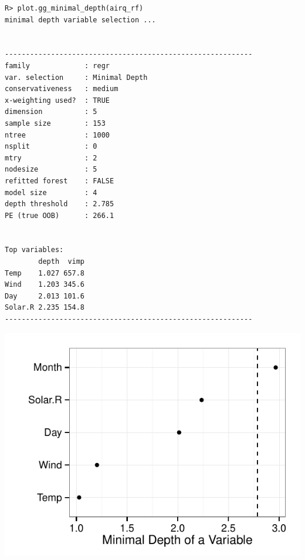 \documentclass[nojss]{jss}\usepackage[]{graphicx}\usepackage[]{color}
\makeatletter
\def\maxwidth{ %
  \ifdim\Gin@nat@width>\linewidth
    \linewidth
  \else
    \Gin@nat@width
  \fi
}
\newenvironment{kframe}{%
 \def\at@end@of@kframe{}%
 \ifinner\ifhmode%
  \def\at@end@of@kframe{\end{minipage}}%
  \begin{minipage}{\columnwidth}%
 \fi\fi%
 \def\FrameCommand##1{\hskip\@totalleftmargin \hskip-\fboxsep
 \colorbox{shadecolor}{##1}\hskip-\fboxsep
     \hskip-\linewidth \hskip-\@totalleftmargin \hskip\columnwidth}%
 \MakeFramed {\advance\hsize-\width
   \@totalleftmargin\z@ \linewidth\hsize
   \@setminipage}}%
 {\par\unskip\endMakeFramed%
 \at@end@of@kframe}
\newenvironment{knitrout}{}{} %
\makeatother
\begin{document}
\begin{knitrout}\footnotesize
{}\color{fgcolor}\begin{kframe}
\begin{verbatim}
R> plot.gg_minimal_depth(airq_rf)
minimal depth variable selection ...


-----------------------------------------------------------
family             : regr 
var. selection     : Minimal Depth 
conservativeness   : medium 
x-weighting used?  : TRUE 
dimension          : 5 
sample size        : 153 
ntree              : 1000 
nsplit             : 0 
mtry               : 2 
nodesize           : 5 
refitted forest    : FALSE 
model size         : 4 
depth threshold    : 2.785 
PE (true OOB)      : 266.1 


Top variables:
        depth  vimp
Temp    1.027 657.8
Wind    1.203 345.6
Day     2.013 101.6
Solar.R 2.235 154.8
-----------------------------------------------------------
\end{verbatim}
\end{kframe}

{\centering \includegraphics[width=\maxwidth]{figure/beamer-airq-mindepth-1} 

}



\end{knitrout}
\end{document}
